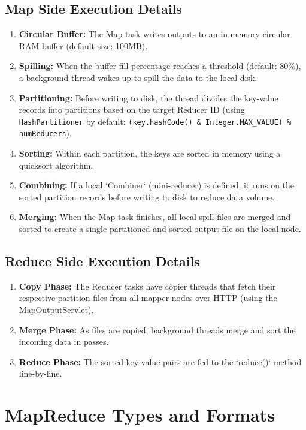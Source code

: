 \documentclass[12pt,a4paper]{article}
\begin{document}
\subsection{Map Side Execution Details}
\begin{enumerate}[leftmargin=*, itemsep=3pt]
  \item \textbf{Circular Buffer:} The Map task writes outputs to an in-memory circular RAM buffer (default size: 100MB).
  \item \textbf{Spilling:} When the buffer fill percentage reaches a threshold (default: 80\%), a background thread wakes up to spill the data to the local disk.
  \item \textbf{Partitioning:} Before writing to disk, the thread divides the key-value records into partitions based on the target Reducer ID (using \texttt{HashPartitioner} by default: \texttt{(key.hashCode() \& Integer.MAX\_VALUE) \% numReducers}).
  \item \textbf{Sorting:} Within each partition, the keys are sorted in memory using a quicksort algorithm.
  \item \textbf{Combining:} If a local `Combiner` (mini-reducer) is defined, it runs on the sorted partition records before writing to disk to reduce data volume.
  \item \textbf{Merging:} When the Map task finishes, all local spill files are merged and sorted to create a single partitioned and sorted output file on the local node.
\end{enumerate}

\subsection{Reduce Side Execution Details}
\begin{enumerate}[leftmargin=*, itemsep=3pt]
  \item \textbf{Copy Phase:} The Reducer tasks have copier threads that fetch their respective partition files from all mapper nodes over HTTP (using the MapOutputServlet).
  \item \textbf{Merge Phase:} As files are copied, background threads merge and sort the incoming data in passes.
  \item \textbf{Reduce Phase:} The sorted key-value pairs are fed to the `reduce()` method line-by-line.
\end{enumerate}

\section{MapReduce Types and Formats}
\end{document}
